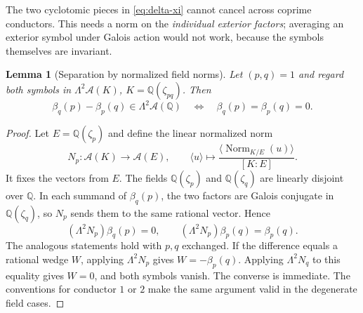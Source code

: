 \documentclass[11pt]{article}
\numberwithin{equation}{section}
\newtheorem{lemma}[theorem]{Lemma}
\theoremstyle{definition}
\theoremstyle{remark}
\newcommand{\Q}{\mathbb Q}
\newcommand{\Acal}{\mathcal A}
\newcommand{\cl}[1]{\langle #1\rangle}
\begin{document}
The two cyclotomic pieces in \eqref{eq:delta-xi} cannot cancel across
coprime conductors. This needs a norm on the \emph{individual exterior
factors}; averaging an exterior symbol under Galois action would not work,
because the symbols themselves are invariant.

\begin{lemma}[Separation by normalized field norms]\label{lem:norm}
Let $(p,q)=1$ and regard both symbols in
$\Lambda^2\Acal(K)$, $K=\Q(\zeta_{pq})$. Then
\begin{equation}\label{eq:norm-separate}
 \beta_q(p)-\beta_p(q)\in\Lambda^2\Acal(\Q)
 \quad\Longleftrightarrow\quad
 \beta_q(p)=\beta_p(q)=0.
\end{equation}
\end{lemma}
\begin{proof}
Let $E=\Q(\zeta_p)$ and define the linear normalized norm
\[
 N_p:\Acal(K)\longrightarrow\Acal(E),\qquad
 \cl u\longmapsto\frac{\cl{\operatorname{Norm}_{K/E}(u)}}{[K:E]}.
\]
It fixes the vectors from $E$. The fields $\Q(\zeta_p)$ and
$\Q(\zeta_q)$ are linearly disjoint over $\Q$. In each summand of
$\beta_q(p)$, the two factors are Galois conjugate in $\Q(\zeta_q)$,
so $N_p$ sends them to the same rational vector. Hence
\[
 (\Lambda^2N_p)\beta_q(p)=0,
 \qquad(\Lambda^2N_p)\beta_p(q)=\beta_p(q).
\]
The analogous statements hold with $p,q$ exchanged. If the difference
equals a rational wedge $W$, applying $\Lambda^2N_p$ gives
$W=-\beta_p(q)$. Applying $\Lambda^2N_q$ to this equality gives $W=0$,
and both symbols vanish. The converse is immediate. The conventions
for conductor $1$ or $2$ make the same argument valid in the degenerate
field cases.
\end{proof}
\end{document}
